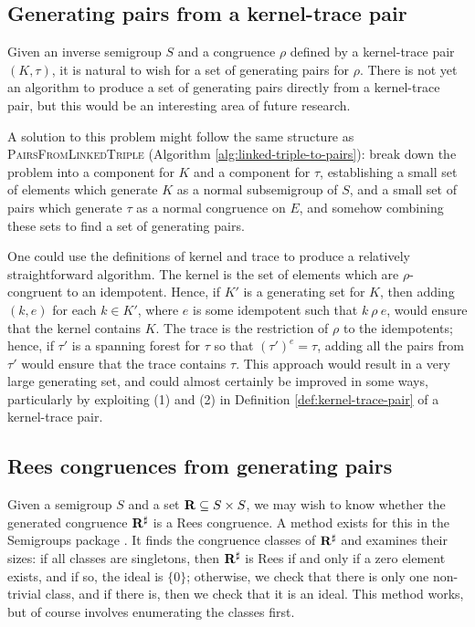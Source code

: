 \subsection{Generating pairs from a kernel-trace pair}
\label{sec:kertr-to-pairs}
Given an inverse semigroup $S$ and a congruence $\rho$ defined by a kernel-trace
pair $(K, \tau)$, it is natural to wish for a set of generating pairs for
$\rho$.  There is not yet an algorithm to produce a set of generating pairs
directly from a kernel-trace pair, but this would be an interesting area of
future research.

A solution to this problem might follow the same structure as
\textsc{PairsFromLinkedTriple} (Algorithm
\ref{alg:linked-triple-to-pairs}): break down the problem into a component for
$K$ and a component for $\tau$, establishing a small set of elements which
generate $K$ as a normal subsemigroup of $S$, and a small set of pairs which
generate $\tau$ as a normal congruence on $E$, and somehow combining these sets
to find a set of generating pairs.

One could use the definitions of kernel and trace to produce a relatively
straightforward algorithm.  The kernel is the set of elements which are
$\rho$-congruent to an idempotent.  Hence, if $K'$ is a generating set for $K$,
then adding $(k,e)$ for each $k \in K'$, where $e$ is some idempotent such that
$k ~\rho~ e$, would ensure that the kernel contains $K$.  The trace is the
restriction of $\rho$ to the idempotents; hence, if $\tau'$ is a spanning forest
for $\tau$ so that $(\tau')^e = \tau$, adding all the pairs from $\tau'$ would
ensure that the trace contains $\tau$.  This approach would result in a very
large generating set, and could almost certainly be improved in some ways,
particularly by exploiting (1) and (2) in Definition \ref{def:kernel-trace-pair}
of a kernel-trace pair.

\subsection{Rees congruences from generating pairs}
\label{sec:pairs-to-rees}
Given a semigroup $S$ and a set $\mathbf{R} \subseteq S \times S$, we may wish to know
whether the generated congruence $\mathbf{R}^\sharp$ is a Rees congruence.  A method exists
for this in the Semigroups package \cite{semigroups}.  It finds the congruence
classes of $\mathbf{R}^\sharp$ and examines their sizes: if all classes are singletons, then
$\mathbf{R}^\sharp$ is Rees if and only if a zero element exists, and if so, the ideal is
$\{0\}$; otherwise, we check that there is only one non-trivial class, and if
there is, then we check that it is an ideal.  This method works, but of course
involves enumerating the classes first.

